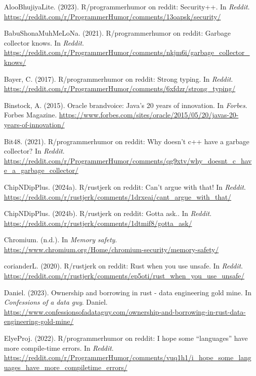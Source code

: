 \documentclass[11pt]{article}
\begin{document}
\begin{hangparas}{1.5em}{1}
\hypertarget{citeproc_bib_item_1}{AlooBhujiyaLite. (2023). R/programmerhumor on reddit: Security++. In \textit{Reddit}. \url{https://reddit.com/r/ProgrammerHumor/comments/13oapsk/security/}}

\hypertarget{citeproc_bib_item_2}{BabuShonaMuhMeLoNa. (2021). R/programmerhumor on reddit: Garbage collector knows. In \textit{Reddit}. \url{https://reddit.com/r/ProgrammerHumor/comments/nkjm6i/garbage_collector_knows/}}

\hypertarget{citeproc_bib_item_3}{Bayer, C. (2017). R/programmerhumor on reddit: Strong typing. In \textit{Reddit}. \url{https://reddit.com/r/ProgrammerHumor/comments/6xfdzr/strong_typing/}}

\hypertarget{citeproc_bib_item_4}{Binstock, A. (2015). Oracle brandvoice: Java’s 20 years of innovation. In \textit{Forbes}. Forbes Magazine. \url{https://www.forbes.com/sites/oracle/2015/05/20/javas-20-years-of-innovation/}}

\hypertarget{citeproc_bib_item_5}{Bit48. (2021). R/programmerhumor on reddit: Why doesn’t c++ have a garbage collector? In \textit{Reddit}. \url{https://reddit.com/r/ProgrammerHumor/comments/qg9xtv/why_doesnt_c_have_a_garbage_collector/}}

\hypertarget{citeproc_bib_item_6}{ChipNDipPlus. (2024a). R/rustjerk on reddit: Can’t argue with that! In \textit{Reddit}. \url{https://reddit.com/r/rustjerk/comments/1drxeai/cant_argue_with_that/}}

\hypertarget{citeproc_bib_item_7}{ChipNDipPlus. (2024b). R/rustjerk on reddit: Gotta ask.. In \textit{Reddit}. \url{https://reddit.com/r/rustjerk/comments/1dtmif8/gotta_ask/}}

\hypertarget{citeproc_bib_item_8}{Chromium. (n.d.). In \textit{Memory safety}. \url{https://www.chromium.org/Home/chromium-security/memory-safety/}}

\hypertarget{citeproc_bib_item_9}{corianderL. (2020). R/rustjerk on reddit: Rust when you use unsafe. In \textit{Reddit}. \url{https://reddit.com/r/rustjerk/comments/ep5oti/rust_when_you_use_unsafe/}}

\hypertarget{citeproc_bib_item_10}{Daniel. (2023). Ownership and borrowing in rust - data engineering gold mine. In \textit{Confessions of a data guy}. Daniel. \url{https://www.confessionsofadataguy.com/ownership-and-borrowing-in-rust-data-engineering-gold-mine/}}

\hypertarget{citeproc_bib_item_11}{ElyeProj. (2022). R/programmerhumor on reddit: I hope some “languages” have more compile-time errors. In \textit{Reddit}. \url{https://reddit.com/r/ProgrammerHumor/comments/vuq1h1/i_hope_some_languages_have_more_compiletime_errors/}}


\end{hangparas}
\end{document}
